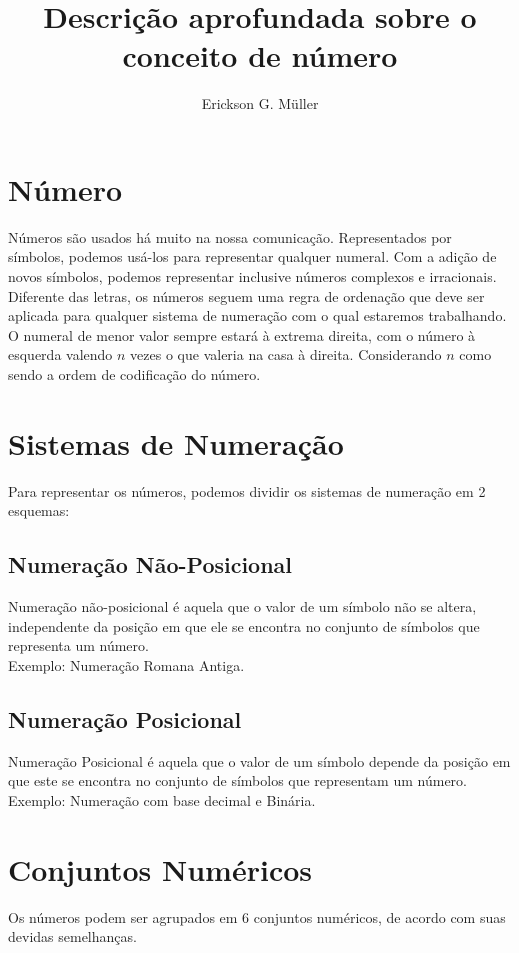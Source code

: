 \documentclass[•]{article}
\title{Descrição aprofundada sobre o conceito de número}
\author{Erickson G. Müller}
\begin{document}
	\maketitle
	\newpage
	\section{Número}
		Números são usados há muito na nossa comunicação. Representados por símbolos, podemos usá-los para representar qualquer numeral. Com a adição de novos símbolos, podemos representar inclusive números complexos e irracionais.
		Diferente das letras, os números seguem uma regra de ordenação que deve ser aplicada para qualquer sistema de numeração com o qual estaremos trabalhando. O numeral de menor valor sempre estará à extrema direita, com o número à esquerda valendo $n$ vezes o que valeria na casa à direita. Considerando $n$ como sendo a ordem de codificação do número.
		
	\section{Sistemas de Numeração}
		Para representar os números, podemos dividir os sistemas de numeração em 2 esquemas:
		
		\subsection{Numeração Não-Posicional}
			Numeração não-posicional é aquela que o valor de um símbolo não se altera, independente da posição em que ele se encontra no conjunto de símbolos que representa um número.\\
Exemplo: Numeração Romana Antiga.

		\subsection{Numeração Posicional}
			Numeração Posicional é aquela que o valor de um símbolo depende da posição em que este se encontra no conjunto de símbolos que representam um número.\\
Exemplo: Numeração com base decimal e Binária.

	\section{Conjuntos Numéricos}
		Os números podem ser agrupados em 6 conjuntos numéricos, de acordo com suas devidas semelhanças.
		
\end{document}

